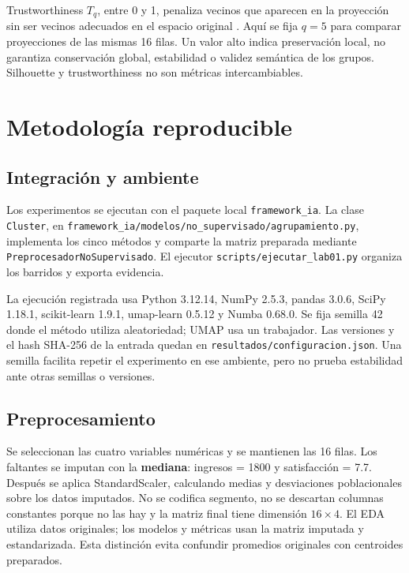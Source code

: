 \documentclass[11pt]{article}
\begin{document}
Trustworthiness $T_q$, entre 0 y 1, penaliza vecinos que aparecen en la
proyección sin ser vecinos adecuados en el espacio original
\cite{sklearntrust}. Aquí se fija $q=5$ para comparar proyecciones de las
mismas 16 filas. Un valor alto indica preservación local, no garantiza
conservación global, estabilidad o validez semántica de los grupos.
Silhouette y trustworthiness no son métricas intercambiables.

\begin{center}
\end{center}
\clearpage

\section{Metodología reproducible}
\subsection{Integración y ambiente}
Los experimentos se ejecutan con el paquete local \texttt{framework\_ia}.
La clase \texttt{Cluster}, en
\texttt{framework\_ia/modelos/no\_supervisado/agrupamiento.py}, implementa
los cinco métodos y comparte la matriz preparada mediante
\texttt{PreprocesadorNoSupervisado}. El ejecutor
\texttt{scripts/ejecutar\_lab01.py} organiza los barridos y exporta evidencia.

La ejecución registrada usa Python 3.12.14, NumPy 2.5.3, pandas 3.0.6,
SciPy 1.18.1, scikit-learn 1.9.1, umap-learn 0.5.12 y Numba 0.68.0.
Se fija semilla 42 donde el método utiliza aleatoriedad; UMAP usa un
trabajador. Las versiones y el hash SHA-256 de la entrada quedan en
\texttt{resultados/configuracion.json}. Una semilla facilita repetir el
experimento en ese ambiente, pero no prueba estabilidad ante otras
semillas o versiones.

\subsection{Preprocesamiento}
Se seleccionan las cuatro variables numéricas y se mantienen las 16 filas.
Los faltantes se imputan con la \textbf{mediana}: ingresos = 1800 y
satisfacción = 7.7. Después se aplica StandardScaler, calculando medias y
desviaciones poblacionales sobre los datos imputados.
No se codifica segmento, no se descartan columnas constantes porque no las
hay y la matriz final tiene dimensión $16\times4$. El EDA utiliza datos
originales; los modelos y métricas usan la matriz imputada y estandarizada.
Esta distinción evita confundir promedios originales con centroides preparados.
\end{document}
